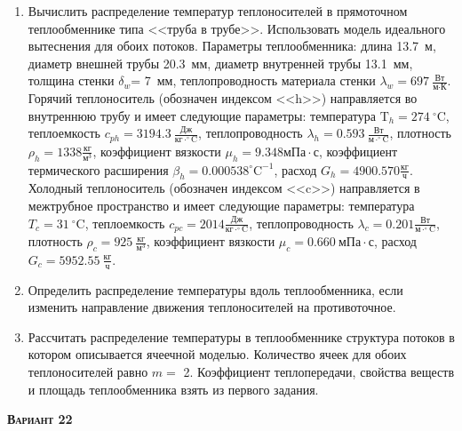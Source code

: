 \begin{enumerate} 
\item Вычислить распределение температур теплоносителей в прямоточном теплообменнике типа <<труба в трубе>>. Использовать модель идеального вытеснения для обоих потоков. Параметры теплообменника: длина  13.7~м, диаметр внешней трубы 20.3~мм,  диаметр внутренней трубы 13.1~мм, толщина стенки $\delta_{w}$=     7~мм,  теплопроводность материала стенки $\lambda_{w}=  697~\frac{\text{Вт}}{\text{м} \cdot \text{К}}$.  Горячий теплоноситель (обозначен индексом <<h>>) направляется во внутреннюю трубу и	 имеет следующие параметры: температура $\text{T}_{h}= 274~^\circ\mathrm{C}$, теплоемкость	  $c_{p{h}}= 3194.3~\frac{\text{Дж}}{\text{кг} \cdot ^\circ\mathrm{C}}$, теплопроводность 		$\lambda_{h}= 0.593~\frac{\text{Вт}}{\text{м} \cdot ^\circ\mathrm{C}}$, плотность 		$\rho_{h}= 1338 \frac{\text{кг}}{\text{м}^3}$, коэффициент вязкости $\mu_{h}=9.348 \text{мПа} 		\cdot \text{с} $, коэффициент термического расширения $\beta_{h}=0.000538 ^\circ\mathrm{C}^{-1}$,		 расход $G_{h}= 4900.570 \frac{\text{кг}}{\text{ч}}$. Холодный теплоноситель (обозначен индексом <<c>>) 		 направляется в межтрубное пространство и имеет следующие параметры: температура $T_{c}=   31		 ~^\circ\mathrm{C}$, теплоемкость $c_{p{c}}= 2014 \frac{\text{Дж}}{\text{кг} \cdot ^\circ\mathrm{C}}$,			 теплопроводность $\lambda_{c}=0.201 \frac{\text{Вт}}{\text{м} \cdot ^\circ\mathrm{C}}$, плотность 			 $\rho_{c}=   925~\frac{\text{кг}}{\text{м}^3}$, коэффициент вязкости $\mu_{c}=0.660~\text{мПа} \cdot \text{с} $, 			 расход $G_{c}=5952.55~\frac{\text{кг}}{\text{ч}}$. 

\item Определить распределение температуры вдоль теплообменника, если 	изменить направление движения теплоносителей на противоточное.

\item Рассчитать распределение температуры в теплообменнике структура потоков в котором описывается ячеечной моделью. Количество ячеек для обоих теплоносителей равно $m = $ 2. Коэффициент теплопередачи, свойства веществ и площадь теплообменника взять из первого задания.

\end{enumerate}

\textsc{\textbf{Вариант 22}}

